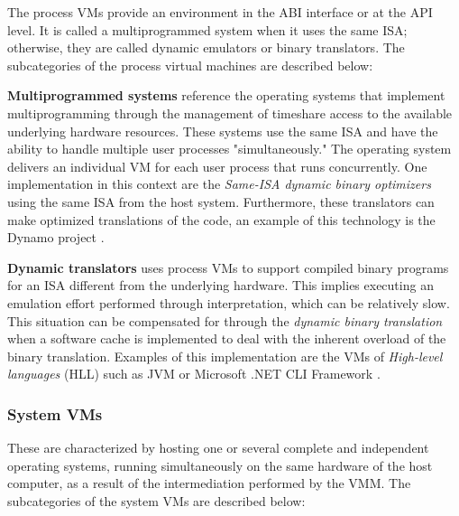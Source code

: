 	The process VMs provide an environment in the ABI interface or at the API level. 
	It is called a multiprogrammed system when it uses the same ISA; otherwise, they are called dynamic emulators or binary translators. 
	The subcategories of the process virtual machines are described below: 
	
	\textbf{Multiprogrammed systems} reference the operating systems that implement multiprogramming through the management of timeshare access to the available underlying hardware resources. These systems use the same ISA and have the ability to handle multiple user processes "simultaneously." The operating system delivers an individual VM for each user process that runs concurrently. One implementation in this context are the \textit{Same-ISA dynamic binary optimizers} using the same ISA from the host system. Furthermore, these translators can make optimized translations of the code, an example of this technology is the Dynamo project \cite{Bala2011}. 
	
	\textbf{Dynamic translators} uses process VMs to support compiled binary programs for an ISA different from the underlying hardware. This implies executing an emulation effort performed through interpretation, which can be relatively slow. This situation can be compensated for through the \textit{dynamic binary translation} when a software cache is implemented to deal with the inherent overload of the binary translation. Examples of this implementation are the VMs of \textit{High-level languages} (HLL)  such as JVM \cite{Lindholm1997} or Microsoft .NET CLI Framework \cite{Fisher2006, Thai2003}.

	\subsubsection{System VMs}
	
	These are characterized by hosting one or several complete and independent operating systems, running simultaneously on the same hardware of the host computer, as a result of the intermediation performed by the VMM. The subcategories of the system VMs are described below:
	
	
		
